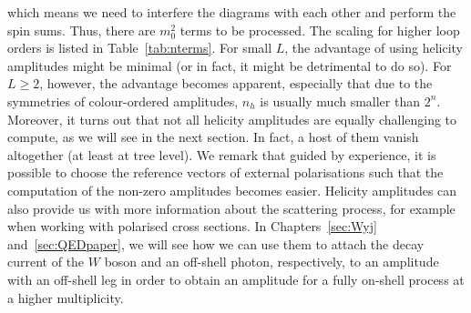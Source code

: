 \documentclass[main.tex]{subfiles}
\begin{document}
which means we need to interfere the diagrams with each other and perform the spin sums. Thus, there are $m_0^2$ terms to be processed. The scaling for higher loop orders is listed in Table~\ref{tab:nterms}. For small $L$, the advantage of using helicity amplitudes might be minimal (or in fact, it might be detrimental to do so). For $L\geq2$, however, the advantage becomes apparent, especially that due to the symmetries of colour-ordered amplitudes, $n_h$ is usually much smaller than $2^n$. Moreover, it turns out that not all helicity amplitudes are equally challenging to compute, as we will see in the next section. In fact, a host of them vanish altogether (at least at tree level). We remark that guided by experience, it is possible to choose the reference vectors of external polarisations such that the computation of the non-zero amplitudes becomes easier. Helicity amplitudes can also provide us with more information about the scattering process, for example when working with polarised cross sections. In Chapters~\ref{sec:Wyj} and~\ref{sec:QEDpaper}, we will see how we can use them to attach the decay current of the $W$ boson and an off-shell photon, respectively, to an amplitude with an off-shell leg in order to obtain an amplitude for a fully on-shell process at a higher multiplicity.
\end{document}
